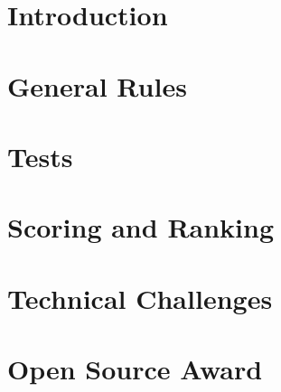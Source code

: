 \documentclass[11pt, twoside, openright, a4paper, chapterprefix]{scrbook}
\begin{document}





\pagestyle{empty}


\tableofcontents
\clearpage

\pagestyle{plain}




\chapter{Introduction}






\chapter{General Rules}



\chapter{Tests}



\chapter{Scoring and Ranking}



\chapter{Technical Challenges} \label{cha:TechnicalChallenges}



\chapter{Open Source Award}



%

%

%



\printabx
\printidx
\end{document}
